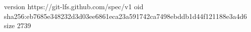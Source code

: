 version https://git-lfs.github.com/spec/v1
oid sha256:eb7685e348232d3d03ee6861eca23a591742ca7498ebddb1d44f121188e3a4d6
size 2739
